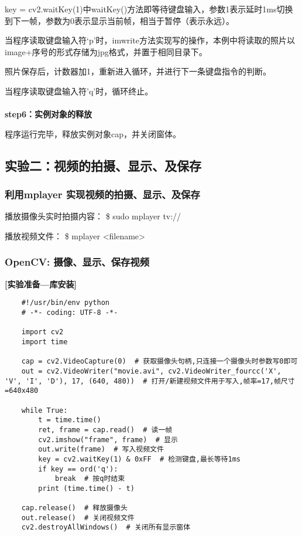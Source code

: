 \documentclass{article}
\begin{document}
key = cv2.waitKey(1)中waitKey()方法即等待键盘输入，参数1表示延时1ms切换到下一帧，参数为0表示显示当前帧，相当于暂停（表示永远）。

当程序读取键盘输入符‘p’时，imwrite方法实现写的操作，本例中将读取的照片以image+序号的形式存储为jpg格式，并置于相同目录下。

照片保存后，计数器加1，重新进入循环，并进行下一条键盘指令的判断。

当程序读取键盘输入符'q'时，循环终止。
\\\hspace*{\fill}\\
\indent\textbf{step6：实例对象的释放}

程序运行完毕，释放实例对象cap，并关闭窗体。

\subsection{实验二：视频的拍摄、显示、及保存}
\subsubsection{利用mplayer
实现视频的拍摄、显示、及保存}
播放摄像头实时拍摄内容：
     \$ sudo mplayer tv://

播放视频文件：
     \$ mplayer <filename>


\subsubsection{OpenCV: 摄像、显示、保存视频
}


\textbf{[实验准备—库安装]}
\begin{lstlisting}
    #!/usr/bin/env python
    # -*- coding: UTF-8 -*-
    
    import cv2
    import time
    
    cap = cv2.VideoCapture(0)  # 获取摄像头句柄,只连接一个摄像头时参数写0即可
    out = cv2.VideoWriter("movie.avi", cv2.VideoWriter_fourcc('X', 'V', 'I', 'D'), 17, (640, 480))  # 打开/新建视频文件用于写入,帧率=17,帧尺寸=640x480
    
    while True:
        t = time.time()
        ret, frame = cap.read()  # 读一帧
        cv2.imshow("frame", frame)  # 显示
        out.write(frame)  # 写入视频文件
        key = cv2.waitKey(1) & 0xFF  # 检测键盘,最长等待1ms
        if key == ord('q'):
            break  # 按q时结束
        print (time.time() - t)
    
    cap.release()  # 释放摄像头
    out.release()  # 关闭视频文件
    cv2.destroyAllWindows()  # 关闭所有显示窗体


\end{lstlisting}
\end{document}
